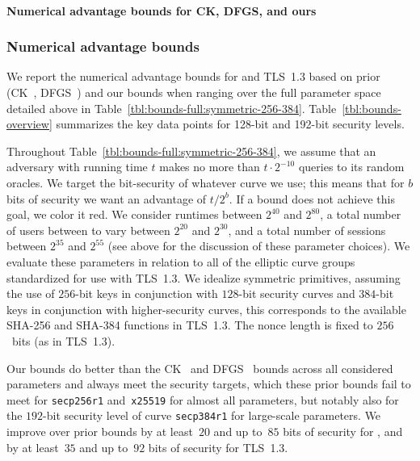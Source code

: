 \iffull
\paragraph{Numerical advantage bounds for CK, DFGS, and ours}
\else
\subsubsection*{Numerical advantage bounds\lncsdot}
\fi

We report the numerical advantage bounds for \SIGMA and TLS~1.3 based on prior (CK~\cite{C:CanKra02}, DFGS~\cite{JC:DFGS21}) and our bounds when ranging over the full parameter space detailed above in Table~\ref{tbl:bounds-full:symmetric-256-384}.
Table~\ref{tbl:bounds-overview} summarizes the key data points for 128-bit and 192-bit security levels.

Throughout Table~\ref{tbl:bounds-full:symmetric-256-384}, we assume that an adversary with running time $t$ makes no more than $t \cdot 2^{-10}$ queries to its random oracles.
We target the bit-security of whatever curve we use; this means that for $b$ bits of security we want an advantage of $t/2^b$.
If a bound does not achieve this goal, we color it red.
We consider runtimes between $2^{40}$ and $2^{80}$,
a total number of users between  to vary between $2^{20}$ and $2^{30}$,
and a total number of sessions between $2^{35}$ and $2^{55}$ (see above for the discussion of these parameter choices).
We evaluate these parameters in relation to all of the elliptic curve groups standardized for use with TLS~1.3.
We idealize symmetric primitives, assuming the use of $256$-bit keys in conjunction with $128$-bit security curves and $384$-bit keys in conjunction with higher-security curves,
this corresponds to the available SHA-256 and SHA-384 functions in TLS~1.3.
The nonce length is fixed to $256$~bits (as in TLS~1.3).

Our bounds do better than the CK~\cite{C:CanKra02} and DFGS~\cite{JC:DFGS21} bounds across all considered parameters and always meet the security targets,
which these prior bounds fail to meet for \texttt{secp256r1} and~\texttt{x25519} for almost all parameters,
but notably also for the $192$-bit security level of curve \texttt{secp384r1} for large-scale parameters.
We improve over prior bounds by at least~$20$ and up to~$85$ bits of security for \SIGMA,
and by at least~$35$ and up to~$92$ bits of security for TLS~1.3.

